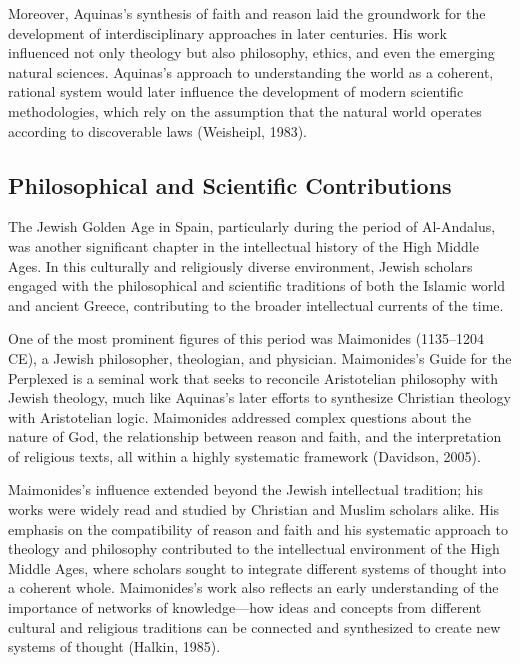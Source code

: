 \documentclass[twocolumn]{article}
\begin{document}
\textcolor{primary}{Moreover, Aquinas's synthesis of faith and reason laid the groundwork for the development of interdisciplinary approaches in later centuries. His work influenced not only theology but also philosophy, ethics, and even the emerging natural sciences. Aquinas's approach to understanding the world as a coherent, rational system would later influence the development of modern scientific methodologies, which rely on the assumption that the natural world operates according to discoverable laws (Weisheipl, 1983).}

\subsection{Philosophical and Scientific Contributions}

\textcolor{primary}{The Jewish Golden Age in Spain, particularly during the period of Al-Andalus, was another significant chapter in the intellectual history of the High Middle Ages. In this culturally and religiously diverse environment, Jewish scholars engaged with the philosophical and scientific traditions of both the Islamic world and ancient Greece, contributing to the broader intellectual currents of the time.}

\textcolor{secondary}{One of the most prominent figures of this period was Maimonides (1135–1204 CE), a Jewish philosopher, theologian, and physician. Maimonides’s Guide for the Perplexed is a seminal work that seeks to reconcile Aristotelian philosophy with Jewish theology, much like Aquinas’s later efforts to synthesize Christian theology with Aristotelian logic. Maimonides addressed complex questions about the nature of God, the relationship between reason and faith, and the interpretation of religious texts, all within a highly systematic framework (Davidson, 2005).}


\textcolor{primary}{Maimonides’s influence extended beyond the Jewish intellectual tradition; his works were widely read and studied by Christian and Muslim scholars alike. His emphasis on the compatibility of reason and faith and his systematic approach to theology and philosophy contributed to the intellectual environment of the High Middle Ages, where scholars sought to integrate different systems of thought into a coherent whole. Maimonides’s work also reflects an early understanding of the importance of networks of knowledge—how ideas and concepts from different cultural and religious traditions can be connected and synthesized to create new systems of thought (Halkin, 1985).}
\end{document}
